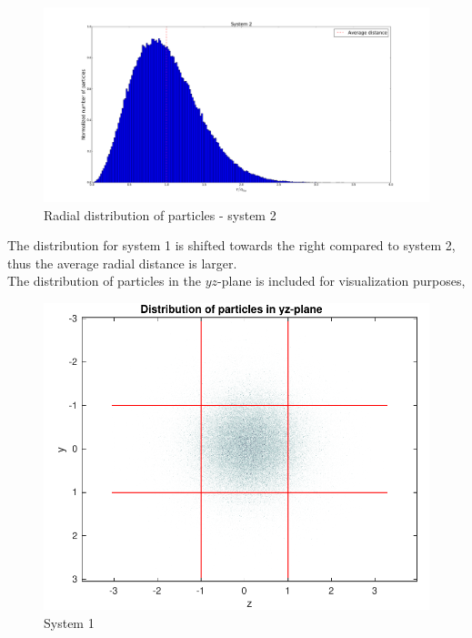 \documentclass[english, a4paper]{article}
\begin{document}
\begin{figure}[H]
\begin{center}
  \includegraphics[width = 200mm]{radialDistSystem2.pdf}
  \caption{Radial distribution of particles - system 2}\label{fig:density2}
  \end{center}
\end{figure}
The distribution for system 1 is shifted towards the right compared to system 2, thus
the average radial distance is larger. \\

\noindent The distribution of particles in the $yz$-plane is included for visualization purposes,
\begin{figure}[H]
\begin{center}
  \includegraphics[width = 140mm]{radialDist1YZ.pdf}
  \caption{System 1}\label{fig:density3}
  \end{center}
\end{figure}
\end{document}

